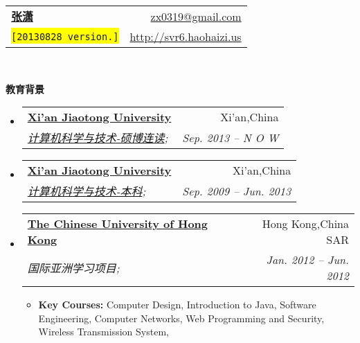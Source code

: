 \documentclass[letterpaper,11pt]{article}
\makeatletter
\newcommand{\resitem}[1]{\item #1 \vspace{-2pt}}
\newcommand{\resheading}[1]{{\large \colorbox{mygrey}{\begin{minipage}{\textwidth}{\textbf{#1 \vphantom{p\^{E}}}}\end{minipage}}}}
\newcommand{\ressubheading}[4]{
\begin{tabular*}{6.5in}{l@{\extracolsep{\fill}}r}
		\textbf{#1} & #2 \\
		\textit{#3} & \textit{#4} \\
\end{tabular*}\vspace{-6pt}}
\makeatother
\begin{document}
\begin{CJK}{UTF8}{gbsn}

\newcommand{\mywebheader}{
\begin{tabular*}{7in}{l@{\extracolsep{\fill}}r}
	\textbf{\href{http://svr6.haohaizi.us/}{\LARGE 张潇}} & \href{mailto:zx0319@gmail.com}{zx0319@gmail.com}\\
	{\footnotesize \texttt{\colorbox{yellow}{[20130828 version.]}}} & \href{http://svr6.haohaizi.us}{http://svr6.haohaizi.us} \\
	\end{tabular*}
\\
\vspace{0.1in}}

\mywebheader

\resheading{教育背景}
	\begin{itemize}
		\item
			\ressubheading{\href{http://www.xjtu.edu.cn}{Xi'an Jiaotong University}}{Xi'an,China}{\href{http://www.cs.xjtu.edu.cn}{计算机科学与技术-硕博连读};}{Sep. 2013 --  N O W }
		\item
			\ressubheading{\href{http://www.xjtu.edu.cn}{Xi'an Jiaotong University}}{Xi'an,China}{\href{http://www.cs.xjtu.edu.cn}{计算机科学与技术-本科};}{Sep. 2009 -- Jun. 2013}
			
		\item
			\ressubheading{\href{http://www.cuhk.edu.hk}{The Chinese University of Hong Kong}}{Hong Kong,China SAR}{{国际亚洲学习项目};}{Jan. 2012 -- Jun. 2012}
				{ \footnotesize
				\begin{itemize}
					\resitem
					{\textbf{Key Courses:}
						{Computer Design},
						{Introduction to Java},
						{Software Engineering},
						{Computer Networks},
						{Web Programming and Security},
						{Wireless Transmission System},
					}
				\end{itemize}
			}
	\end{itemize} %


\end{CJK}
\end{document}
